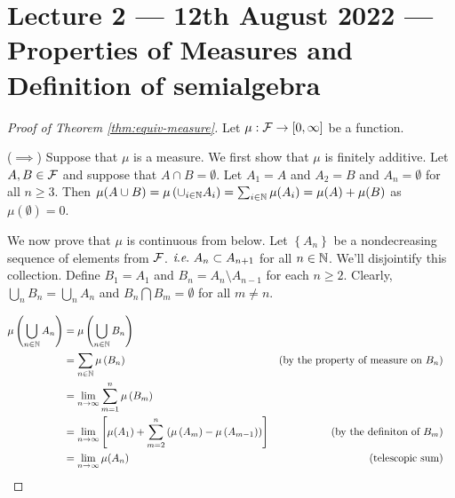 \section{Lecture 2 --- 12th August 2022 --- Properties of Measures and Definition of semialgebra}

\begin{proof}[Proof of Theorem \ref{thm:equiv-measure}] 
    Let $\mu : {\cal F} \to [0,\infty]$ be a function.

    ($\implies$) Suppose that $\mu$ is a measure. We first show that $\mu$ is finitely additive. Let $A, B \in {\cal F}$ and suppose that $A\cap B=\emptyset$. Let $A_1 =A $ and $A_2 =B$ and $A_n = \emptyset$ for all $n\ge 3$. Then $\mu (A\cup B) = \mu \left( \cup_{i\in\mathbb N} A_i \right) = \sum_{i\in\mathbb N} \mu (A_i) = \mu (A) + \mu (B)$ as $\mu (\emptyset ) =0$. 

    We now prove that $\mu$ is continuous from below. Let $\left\{ A_n \right\}$ be a nondecreasing sequence of elements from ${\cal F}$. $\textit{i}.\textit{e}. \ A_n \subset A_{n+1}$ for all $n \in \mathbb N$. We'll disjointify this collection. Define $B_1=A_1$ and $B_n = A_n \setminus A_{n-1}$ for each $n\ge 2$. Clearly, $\bigcup_n B_n = \bigcup_n A_n$ and $B_n \bigcap B_m = \emptyset$ for all $m\ne n$.

    \begin{align*}
        \mu \left( \bigcup_{n \in \mathbb N} A_n \right) &= \mu \left( \bigcup_{n \in \mathbb N} B_n \right) &\\
        &= \sum_{n\in \mathbb N} \mu \left( B_n \right) & \text{(by the property of measure on } B_n ) &\\
        &= \lim_{n \to \infty} \sum_{m=1}^{n} \mu \left( B_m \right) &\\
        &= \lim_{n \to \infty} \left[\mu (A_1) +\sum_{m=2}^{n} \left(\mu \left( A_m \right) - \mu \left( A_{m-1} \right) \right) \right] & \text{(by the definiton of } B_m ) \\
        &= \lim_{n \to \infty} \mu (A_n) & \text{(telescopic sum)}
    \end{align*}


\end{proof}
